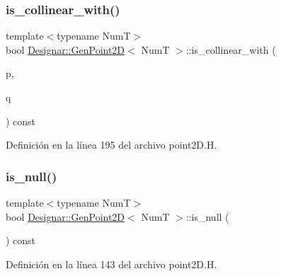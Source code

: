 \mbox{\label{class_designar_1_1_gen_point2_d_a5ffe32dc4a322ba54d2bcc0d4b2a04e6}} 
\subsubsection{\texorpdfstring{is\+\_\+collinear\+\_\+with()}{is\_collinear\_with()}}
{\footnotesize\ttfamily template$<$typename NumT$>$ \\
bool \hyperlink{class_designar_1_1_gen_point2_d}{Designar\+::\+Gen\+Point2D}$<$ NumT $>$\+::is\+\_\+collinear\+\_\+with (\begin{DoxyParamCaption}\item[{const \hyperlink{class_designar_1_1_gen_point2_d}{Gen\+Point2D}$<$ NumT $>$ \&}]{p,  }\item[{const \hyperlink{class_designar_1_1_gen_point2_d}{Gen\+Point2D}$<$ NumT $>$ \&}]{q }\end{DoxyParamCaption}) const\hspace{0.3cm}{\ttfamily [inline]}}



Definición en la línea 195 del archivo point2\+D.\+H.

\mbox{\label{class_designar_1_1_gen_point2_d_aa6c5b4c078b46565646f1bd93dae5bf4}} 
\subsubsection{\texorpdfstring{is\+\_\+null()}{is\_null()}}
{\footnotesize\ttfamily template$<$typename NumT$>$ \\
bool \hyperlink{class_designar_1_1_gen_point2_d}{Designar\+::\+Gen\+Point2D}$<$ NumT $>$\+::is\+\_\+null (\begin{DoxyParamCaption}{ }\end{DoxyParamCaption}) const\hspace{0.3cm}{\ttfamily [inline]}}



Definición en la línea 143 del archivo point2\+D.\+H.

